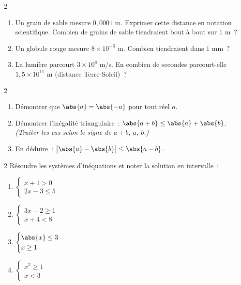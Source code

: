 \begin{exo}{2}
\begin{enumerate}
  \item Un grain de sable mesure $0{,}0001$ m.
        Exprimer cette distance en notation scientifique.
        Combien de grains de sable tiendraient bout \`a bout sur $1$ m~?
  \item Un globule rouge mesure $8\times10^{-6}$ m.
        Combien tiendraient dans $1$ mm~?
  \item La lumi\`ere parcourt $3\times10^8$ m/s.
        En combien de secondes parcourt-elle $1{,}5\times10^{11}$ m
        (distance Terre-Soleil)~?
\end{enumerate}
\end{exo}

\begin{exo}{2}
\begin{enumerate}
  \item D\'emontrer que $\abs{a} = \abs{-a}$ pour tout r\'eel $a$.
  \item D\'emontrer l'in\'egalit\'e triangulaire~:
        $\abs{a+b} \leq \abs{a}+\abs{b}$.
        \emph{(Traiter les cas selon le signe de $a+b$, $a$, $b$.)}
  \item En d\'eduire~: $\bigl|\abs{a}-\abs{b}\bigr| \leq \abs{a-b}$.
\end{enumerate}
\end{exo}

\begin{exo}{2}
R\'esoudre les syst\`emes d'in\'equations et noter la solution en intervalle~:
\begin{enumerate}
  \item $\begin{cases} x + 1 > 0 \\ 2x - 3 \leq 5 \end{cases}$
  \item $\begin{cases} 3x - 2 \geq 1 \\ x + 4 < 8 \end{cases}$
  \item $\begin{cases} \abs{x} \leq 3 \\ x \geq 1 \end{cases}$
  \item $\begin{cases} x^2 \geq 1 \\ x < 3 \end{cases}$
\end{enumerate}
\end{exo}


